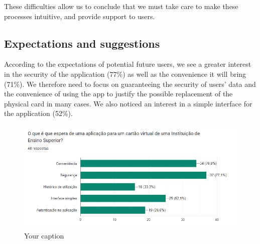 \documentclass{article}
\begin{document}
These difficulties allow us to conclude that we must take care to make these processes intuitive, and provide support to users.



\subsection{Expectations and suggestions}

According to the expectations of potential future users, we see a greater interest in the security of the application (77\%) as well as the convenience it will bring (71\%). We therefore need to focus on guaranteeing the security of users' data and the convenience of using the app to justify the possible replacement of the physical card in many cases.
We also noticed an interest in a simple interface for the application (52\%).

\begin{figure}[h]
    \centering
    \includegraphics[width=1\textwidth]{images/questionaire4.png}
    \caption{Your caption}
\end{figure}
\end{document}
